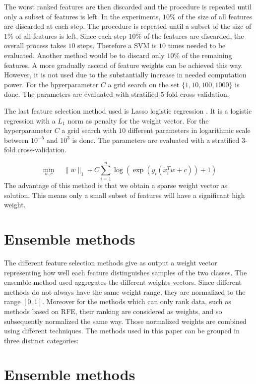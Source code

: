 \documentclass[twoside,11pt]{article}
\begin{document}
The worst ranked features are then discarded and the procedure is repeated until only a subset of features is left. In the experiments, $10\%$ of the size of all features are discarded at each step. The procedure is repeated until a subset of the size of $1\%$ of all features is left. Since each step $10\%$ of the features are discarded, the overall process takes $10$ steps. Therefore a SVM is $10$ times needed to be evaluated. Another method would be to discard only $10\%$ of the remaining features. A more gradually ascend of feature weights can be achieved this way. However, it is not used due to the substantially increase in needed computation power. For the hpyerparameter $C$ a grid search on the set $\{1, 10, 100, 1000\}$ is done. The parameters are evaluated with stratified 5-fold cross-validation.

The last feature selection method used is Lasso logistic regression \citep{wheeler2010lasso}. It is a logistic regression with a $L_1$ norm as penalty for the weight vector. For the hyperparameter $C$ a grid search with $10$ different parameters in logarithmic scale between $10^{-5}$ and $10^3$ is done. The parameters are evaluated with a stratified 3-fold cross-validation.

\begin{equation}
    \min_{w,c} \quad \|w\|_1 + C\sum_{i=1}^n \log(\exp(y_i(x_i^Tw + c))+1)
  \end{equation}
  The advantage of this method is that we obtain a sparse weight vector as solution. This means only a small subset of features will have a significant high weight.
  \section{Ensemble methods}
  The different feature selection methods give as output a weight vector representing how well each feature distinguishes samples of the two classes. The ensemble method used aggregates the different weights vectors. Since different methods do not always have the same weight range, they are normalized to the range $[0,1]$. Moreover for the methods which can only rank data, such as methods based on RFE, their ranking are considered as weights, and so subsequently normalized the same way. 
  Those normalized weights are combined using different techniques. The methods used in this paper can be grouped in three distinct categories: 

\section{Ensemble methods}
\end{document}
